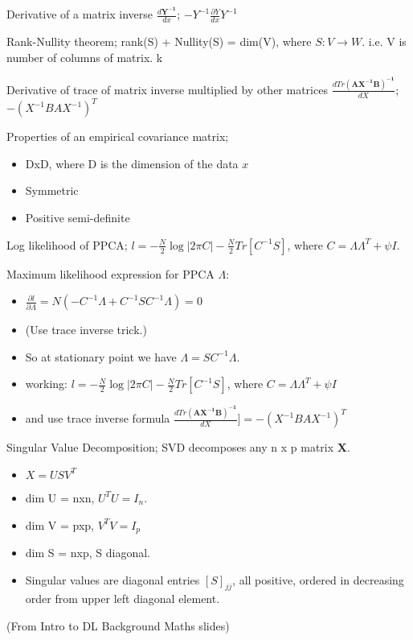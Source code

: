 \documentclass{article}
\begin{document}
Derivative of a matrix inverse $\frac{d\mathbf{Y^{-1}}}{dx}$; $-Y^{-1}\frac{\partial{Y}}{dx}Y^{-1}$

Rank-Nullity theorem; rank(S) + Nullity(S) = dim(V), where $S:V\to W$. i.e. V is number of columns of matrix. k

Derivative of trace of matrix inverse multiplied by other matrices $\frac{d Tr \mathbf{(AX^{-1}B)^{-1}}}{dX}$; $-(X^{-1}BAX^{-1})^T$

Properties of an empirical covariance matrix; \begin{itemize}
	\item DxD, where D is the dimension of the data $x$
	\item Symmetric
	\item Positive semi-definite
\end{itemize}

Log likelihood of PPCA; $l = -\frac{N}{2}\log|2\pi C|-\frac{N}{2}Tr[C^{-1}S]$, where $C=\Lambda\Lambda^T+\psi I$.

Maximum likelihood expression for PPCA $\Lambda$: \begin{itemize}
	\item $\frac{\partial l}{\partial \Lambda} = N(-C^{-1}\Lambda+C^{-1}SC^{-1}\Lambda) = 0$
	\item (Use trace inverse trick.)
	\item So at stationary point we have $\Lambda = SC^{-1}\Lambda$.
	\item working: $l = -\frac{N}{2}\log|2\pi C|-\frac{N}{2}Tr[C^{-1}S]$, where $C=\Lambda\Lambda^T+\psi I$
	\item and use trace inverse formula $\frac{d Tr \mathbf{(AX^{-1}B)^{-1}}}{dX}] = -(X^{-1}BAX^{-1})^T$
\end{itemize}

Singular Value Decomposition; SVD decomposes any n x p matrix $\mathbf{X}$.\begin{itemize}
	\item $X = USV^T$
	\item dim U = nxn, $U^TU=I_n$.
	\item dim V = pxp, $V^TV=I_p$
	\item dim S = nxp, S diagonal. 
	\item Singular values are diagonal entries $[S]_{jj}$, all positive, ordered in decreasing order from upper left diagonal element.
\end{itemize} (From Intro to DL Background Maths slides)
\end{document}
